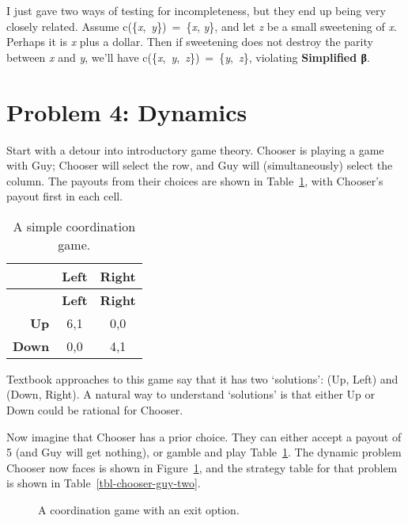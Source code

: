 \documentclass[
  10pt,
  letterpaper,
  DIV=11,
  numbers=noendperiod,
  twoside]{scrartcl}
\begin{document}
I just gave two ways of testing for incompleteness, but they end up
being very closely related. Assume
c(\{\emph{x},~\emph{y}\})~=~\{\emph{x}, \emph{y}\}, and let \emph{z} be
a small sweetening of \emph{x}. Perhaps it is \emph{x} plus a dollar.
Then if sweetening does not destroy the parity between \emph{x} and
\emph{y}, we'll have
c(\{\emph{x},~\emph{y},~\emph{z}\})~=~\{\emph{y},~\emph{z}\}, violating
\textbf{Simplified β}.

\section{Problem 4: Dynamics}\label{sec-dynamic}

Start with a detour into introductory game theory. Chooser is playing a
game with Guy; Chooser will select the row, and Guy will
(simultaneously) select the column. The payouts from their choices are
shown in Table~\ref{tbl-chooser-guy}, with Chooser's payout first in
each cell.

\begin{longtable}[]{@{}rcc@{}}
\caption{A simple coordination
game.}\label{tbl-chooser-guy}\tabularnewline
\toprule\noalign{}
& \textbf{Left} & \textbf{Right} \\
\midrule\noalign{}
\endfirsthead
\toprule\noalign{}
& \textbf{Left} & \textbf{Right} \\
\midrule\noalign{}
\endhead
\bottomrule\noalign{}
\endlastfoot
\textbf{Up} & 6,1 & 0,0 \\
\textbf{Down} & 0,0 & 4,1 \\
\end{longtable}

Textbook approaches to this game say that it has two `solutions': (Up,
Left) and (Down, Right). A natural way to understand `solutions' is that
either Up or Down could be rational for Chooser.

Now imagine that Chooser has a prior choice. They can either accept a
payout of 5 (and Guy will get nothing), or gamble and play
Table~\ref{tbl-chooser-guy}. The dynamic problem Chooser now faces is
shown in Figure~\ref{fig-chooser-guy-two}, and the strategy table for
that problem is shown in Table~\ref{tbl-chooser-guy-two}.

\begin{figure}


\caption{\label{fig-chooser-guy-two}A coordination game with an exit
option.}

\end{figure}%
\end{document}
